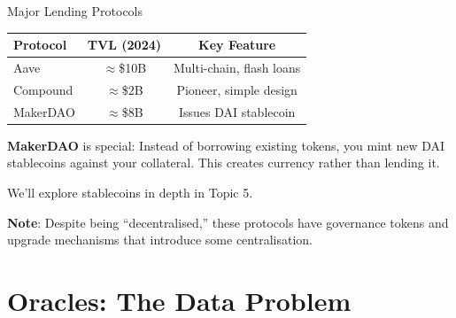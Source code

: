 \documentclass[10pt]{beamer}
\begin{document}
\begin{frame}{Major Lending Protocols}
  \begin{center}
  \begin{tabular}{lcc}
    \toprule
    \textbf{Protocol} & \textbf{TVL (2024)} & \textbf{Key Feature} \\
    \midrule
    Aave & $\approx$\$10B & Multi-chain, flash loans \\
    Compound & $\approx$\$2B & Pioneer, simple design \\
    MakerDAO & $\approx$\$8B & Issues DAI stablecoin \\
    \bottomrule
  \end{tabular}
  \end{center}
  
  \vspace{1em}
  \textbf{MakerDAO} is special: Instead of borrowing existing tokens, you mint new DAI stablecoins against your collateral. This creates currency rather than lending it.
  
  \vspace{0.5em}
  We'll explore stablecoins in depth in Topic 5.
  
  \vspace{1em}
  \textbf{Note}: Despite being ``decentralised,'' these protocols have governance tokens and upgrade mechanisms that introduce some centralisation.
\end{frame}

\section{Oracles: The Data Problem}
\end{document}
